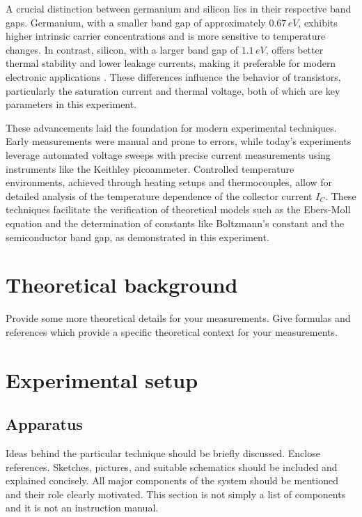 \documentclass[12pt,letterpaper,onecolumn]{article}
\begin{document}
A crucial distinction between germanium and silicon lies in their respective band gaps. Germanium, with a smaller band gap of approximately \(0.67\,eV\), exhibits higher intrinsic carrier concentrations and is more sensitive to temperature changes. In contrast, silicon, with a larger band gap of \(1.1\,eV\), offers better thermal stability and lower leakage currents, making it preferable for modern electronic applications \cite{Collings1980}. These differences influence the behavior of transistors, particularly the saturation current and thermal voltage, both of which are key parameters in this experiment.

These advancements laid the foundation for modern experimental techniques. Early measurements were manual and prone to errors, while today’s experiments leverage automated voltage sweeps with precise current measurements using instruments like the Keithley picoammeter. Controlled temperature environments, achieved through heating setups and thermocouples, allow for detailed analysis of the temperature dependence of the collector current \(I_C\). These techniques facilitate the verification of theoretical models such as the Ebers-Moll equation and the determination of constants like Boltzmann's constant and the semiconductor band gap, as demonstrated in this experiment.



\section{Theoretical background}

Provide some more theoretical details for your measurements.
Give formulas and references which provide a specific theoretical
context for your measurements.



\section{Experimental setup}


\subsection{Apparatus}

Ideas behind the particular technique should be briefly
discussed. Enclose references. Sketches, pictures, and
suitable schematics should be included and explained
concisely. All major components of the system should be
mentioned and their role clearly motivated. This section
is not simply a list of components and it is not an
instruction manual. 
\end{document}
